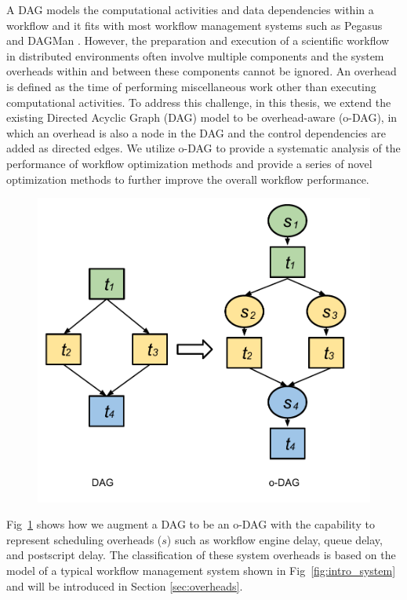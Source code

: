 A DAG models the computational activities and data dependencies within a workflow and it fits with most workflow management systems such as Pegasus \cite{Deelman2004} and DAGMan \cite{Kalayci2010}. However, the preparation and execution of a scientific workflow in distributed environments often involve multiple components and the system overheads within and between these components cannot be ignored. 
An overhead is defined as the time of performing miscellaneous work other than executing computational activities. 
To address this challenge, in this thesis, we extend the existing Directed Acyclic Graph (DAG) model to be overhead-aware (o-DAG), in which an overhead is also a node in the DAG and the control dependencies are added as directed edges. We utilize o-DAG to provide a systematic analysis of the performance of workflow optimization methods and provide a series of novel optimization methods to further improve the overall workflow performance. 





\begin{figure}[h!]
\includegraphics[width=0.6\linewidth]{figures/model/odag.pdf}
\centering
  \label{fig:model_odag}
\end{figure}

Fig~\ref{fig:model_odag} shows how we augment a DAG to be an o-DAG with the capability to represent scheduling overheads ($s$) such as workflow engine delay, queue delay, and postscript delay. The classification of these system overheads is based on the model of a typical workflow management system shown in Fig~\ref{fig:intro_system} and will be introduced in Section \ref{sec:overheads}. 


